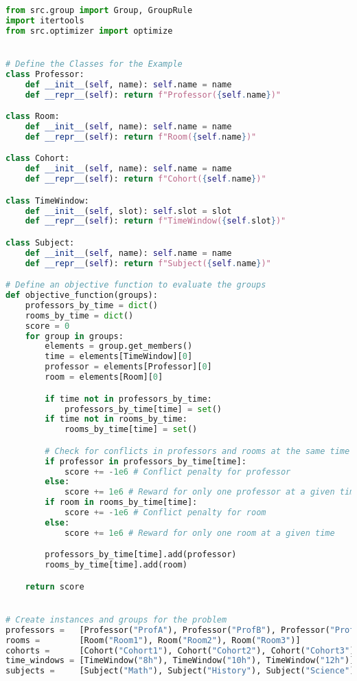 \begin{lstlisting}[language=Python, caption={Creating and solving the Timetable Scheduling Problem using this framework.}, label={script:time_table}]
from src.group import Group, GroupRule
import itertools
from src.optimizer import optimize


# Define the Classes for the Example
class Professor:
    def __init__(self, name): self.name = name
    def __repr__(self): return f"Professor({self.name})"

class Room:
    def __init__(self, name): self.name = name
    def __repr__(self): return f"Room({self.name})"

class Cohort:
    def __init__(self, name): self.name = name
    def __repr__(self): return f"Cohort({self.name})"

class TimeWindow:
    def __init__(self, slot): self.slot = slot
    def __repr__(self): return f"TimeWindow({self.slot})"

class Subject:
    def __init__(self, name): self.name = name
    def __repr__(self): return f"Subject({self.name})"

# Define an objective function to evaluate the groups
def objective_function(groups):
    professors_by_time = dict()
    rooms_by_time = dict()
    score = 0
    for group in groups:
        elements = group.get_members()
        time = elements[TimeWindow][0]
        professor = elements[Professor][0]
        room = elements[Room][0]

        if time not in professors_by_time:
            professors_by_time[time] = set()
        if time not in rooms_by_time:
            rooms_by_time[time] = set()

        # Check for conflicts in professors and rooms at the same time
        if professor in professors_by_time[time]:
            score += -1e6 # Conflict penalty for professor
        else:
            score += 1e6 # Reward for only one professor at a given time
        if room in rooms_by_time[time]:
            score += -1e6 # Conflict penalty for room
        else:
            score += 1e6 # Reward for only one room at a given time

        professors_by_time[time].add(professor)
        rooms_by_time[time].add(room)

    return score


# Create instances and groups for the problem
professors =   [Professor("ProfA"), Professor("ProfB"), Professor("ProfC")]
rooms =        [Room("Room1"), Room("Room2"), Room("Room3")]
cohorts =      [Cohort("Cohort1"), Cohort("Cohort2"), Cohort("Cohort3")]
time_windows = [TimeWindow("8h"), TimeWindow("10h"), TimeWindow("12h")]
subjects =     [Subject("Math"), Subject("History"), Subject("Science")]


\end{lstlisting}
